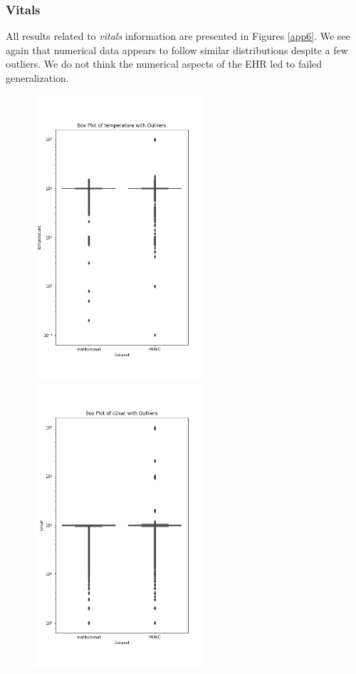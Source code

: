 \documentclass{article}
\theoremstyle{plain}
\theoremstyle{definition}
\theoremstyle{remark}
\begin{document}
 \subsubsection*{Vitals}
All results related to \textit{vitals} information are presented in Figures \ref{app6}. We see again that numerical data appears to follow similar distributions despite a few outliers. We do not think the numerical aspects of the EHR led to failed generalization.
\begin{figure}[h!]
   \centering 
   \includegraphics[width=2.5in]{plots/temperature_boxplot.png} 
   \includegraphics[width=2.5in]{plots/o2sat_boxplot.png} 

\end{figure}
\end{document}
